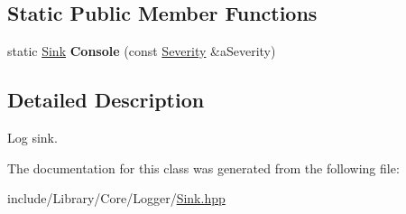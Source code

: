\subsection*{Static Public Member Functions}
\begin{DoxyCompactItemize}
\item 
\mbox{\label{classlibrary_1_1core_1_1logger_1_1_sink_ae3a2c4036340751f16a32e428a9c168a}} 
static \hyperlink{classlibrary_1_1core_1_1logger_1_1_sink}{Sink} {\bfseries Console} (const \hyperlink{_severity_8hpp_a35f71353edf64f68f7fe3874b01abaa8}{Severity} \&a\+Severity)
\end{DoxyCompactItemize}


\subsection{Detailed Description}
Log sink. 

The documentation for this class was generated from the following file\+:\begin{DoxyCompactItemize}
\item 
include/\+Library/\+Core/\+Logger/\hyperlink{_sink_8hpp}{Sink.\+hpp}\end{DoxyCompactItemize}
